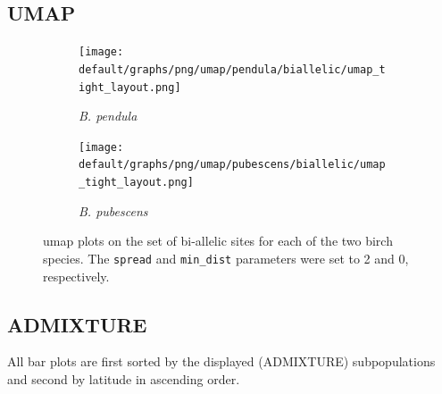 \documentclass[hidelinks,11pt]{article}
\newcommand{\pendula}{\textit{B. pendula}}
\newcommand{\pubescens}{\textit{B. pubescens}}
\begin{document}
    \clearpage

    \subsection{UMAP}
    \label{sec:appendix-umap}

    \begin{figure}[H]
        \centering
        \begin{subfigure}[b]{0.487\textwidth}
            \centering
            \texttt{[image: default/graphs/png/umap/pendula/biallelic/umap\_tight\_layout.png]}
            \caption{\pendula{}}
            \label{fig:umap_biallelic_pendula}
        \end{subfigure}
        \hfill
        \begin{subfigure}[b]{0.5\textwidth}
            \centering
            \texttt{[image: default/graphs/png/umap/pubescens/biallelic/umap\_tight\_layout.png]}
            \caption{\pubescens{}}
            \label{fig:umap_biallelic_pubescens}
        \end{subfigure}
        \caption{\acrshort{umap} plots on the set of bi-allelic sites for each of the two birch species. The \texttt{spread} and \texttt{min\_dist} parameters were set to 2 and 0, respectively.}
        \label{fig:umap_biallelic_pendula_pubescens_separate}
    \end{figure}

    \clearpage

    \subsection{ADMIXTURE}

    All bar plots are first sorted by the displayed (\mbox{ADMIXTURE}) subpopulations and second by latitude in ascending order.
\end{document}
